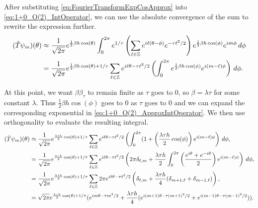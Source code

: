 \documentclass[10pt,reqno]{amsart}
\numberwithin{equation}{section}
\begin{document}
	After substituting \cref{eq:FourierTransformExpCosApprox} into \cref{eq:1+0_O(2)_IntOperator}, we can use the absolute convergence of the sum to rewrite the expression further.
	\begin{align}
		(\hat{T}\psi_m)(\theta) &\approx \frac{1}{\sqrt{2\pi}}e^{\frac{1}{2}\beta h \cos(\theta)} \int_{0}^{2\pi} e^{1/\tau} \left( \sum_{\ell\in \mathbb{Z}}e^{i\ell(\theta-\phi)}e^{-\tau\ell^2/2} \right) e^{\frac{1}{2}\beta h \cos(\phi)}e^{im\phi}\, d\phi \nonumber \\
			&= \frac{1}{\sqrt{2\pi}}e^{\frac{1}{2}\beta h \cos(\theta)+1/\tau} \sum_{\ell\in \mathbb{Z}} e^{i\ell\theta-\tau\ell^2/2}\left(\int_{0}^{2\pi} e^{\frac{1}{2}\beta h \cos(\phi)}e^{i(m-\ell)\phi}\right) \, d\phi. \label{eq:1+0_O(2)_ApproxIntOperator}
	\end{align}
	
	At this point, we want $\beta\beta_\tau$ to remain finite as $\tau$ goes to 0, so $\beta=\lambda \tau$ for some constant $\lambda$. 
	Thus $\frac{1}{2}\beta h \cos(\phi)$ goes to 0 as $\tau$ goes to 0 and we can expand the corresponding exponential in \cref{eq:1+0_O(2)_ApproxIntOperator}.
	We then use orthogonality to evaluate the resulting integral.
	\begin{align*}
		(\hat{T}\psi_m)(\theta) &\approx \frac{1}{\sqrt{2\pi}}e^{\frac{\lambda\tau h}{2} \cos(\theta)+1/\tau} \sum_{\ell\in \mathbb{Z}} e^{i\ell\theta-\tau\ell^2/2}\left(\int_{0}^{2\pi} (1+\left(\frac{\lambda \tau h}{2}\cos(\phi) \right) e^{i(m-\ell)\phi}\right) \, d\phi,  \\
		&= \frac{1}{\sqrt{2\pi}}e^{\frac{\lambda\tau h}{2} \cos(\theta)+1/\tau} \sum_{\ell\in \mathbb{Z}} e^{i\ell\theta-\tau\ell^2/2}\left( 2\pi \delta_{\ell,m}+ \frac{\lambda \tau h}{2}\int_{0}^{2\pi} \left( \frac{e^{i\theta}+e^{-i\theta}}{2} \right)  e^{i(m-\ell)\phi}\right) \, d\phi,  \\
		&= \frac{1}{\sqrt{2\pi}} e^{\frac{\lambda\tau h}{2} \cos(\theta)+1/\tau} \sum_{\ell\in \mathbb{Z}} 2\pi e^{i\ell\theta-\tau\ell^2/2}\left(\delta_{\ell,m}+ \frac{\lambda \tau h}{4}(\delta_{m+1,\ell}+\delta_{m-1,\ell}) \right),  \\
		&= \sqrt{2\pi} e^{\frac{\lambda\tau h}{2} \cos(\theta)+1/\tau} ( e^{im\theta - \tau m^2/2}+ \frac{\lambda \tau h}{4} (e^{i(m+1)\theta - \tau (m+1)^2/2}+ e^{i(m-1)\theta - \tau (m-1)^2/2} ) ). 
	\end{align*}
	
\end{document}
